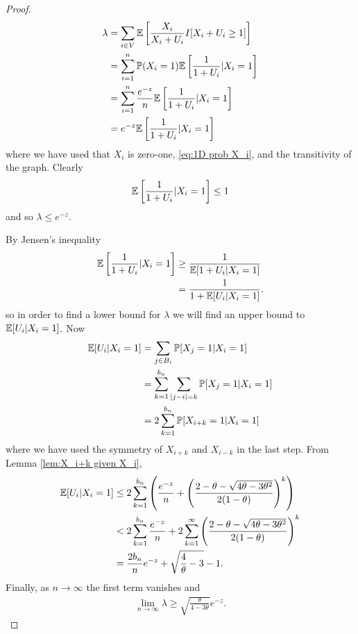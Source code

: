 	\begin{proof}
		\begin{align}
			\lambda &= \sum_{i \in V} \mathbb{E}\left[\frac{X_i}{X_i + U_i} I[ X_i + U_i \geq 1] \right]\\
				&= \sum_{i = 1}^n \mathbb{P}(X_i = 1) \mathbb{E} \left[\frac{1}{1 + U_i}| X_i = 1\right]\\
				&= \sum_{i = 1}^n \frac{e^{-z}}{n} \mathbb{E} \left[\frac{1}{1 + U_i}| X_i = 1\right]\\
				&= e^{-z} \mathbb{E} \left[\frac{1}{1 + U_i}| X_i = 1\right]
		\end{align}
		where we have used that $X_i$ is zero-one, \eqref{eq:1D prob X_i}, and the transitivity of the graph.
		Clearly 
		\begin{align}
			\mathbb{E} \left[\frac{1}{1 + U_i}| X_i = 1\right] \leq 1
		\end{align}
		and so $\lambda \leq e^{-z}$.

		By Jensen's inequality
		\begin{align}
			\mathbb{E} \left[\frac{1}{1 + U_i}| X_i = 1\right] &\geq \frac{1}{\mathbb{E}[1 + U_i | X_i = 1]}\\
				&= \frac{1}{1 + \mathbb{E}[U_i | X_i = 1]}.
		\end{align}
		so in order to find a lower bound for $\lambda$ we will find an upper bound to $\mathbb{E}[U_i | X_i = 1]$. Now
		\begin{align}
			\mathbb{E}[U_i | X_i = 1] &= \sum_{j \in B_i} \mathbb{P}[X_j = 1| X_i = 1]\\
				&= \sum_{k=1}^{b_n} \sum_{|j - i| = k} \mathbb{P}[X_j = 1| X_i = 1]\\
				&= 2 \sum_{k=1}^{b_n} \mathbb{P}[X_{i+k} = 1 | X_i = 1]
		\end{align}
		where we have used the symmetry of $X_{i+k}$ and $X_{i -k}$ in the last step. From Lemma \ref{lem:X_i+k given X_i}, 
		\begin{align}
			\mathbb{E}[U_i | X_i = 1] &\leq 2 \sum_{k = 1}^{b_n} \left(\frac{e^{-z}}{n} + \left(\frac{2 - \theta - \sqrt{4\theta - 3\theta^2}}{2(1 - \theta)}\right)^k\right)\\
				&< 2 \sum_{k = 1}^{b_n} \frac{e^{-z}}{n} + 2\sum_{k = 1}^\infty \left(\frac{2 - \theta - \sqrt{4\theta - 3\theta^2}}{2(1 - \theta)}\right)^k\\
				&= \frac{2 b_n}{n}e^{-z} + \sqrt{\frac{4}{\theta} - 3} - 1.
		\end{align}
		Finally, as $n \rightarrow \infty$ the first term vanishes and
		\begin{align}
			\lim_{n \rightarrow \infty} \lambda \geq \sqrt{\frac{\theta}{4 - 3\theta}} e^{-z}.
		\end{align}
	\end{proof}


